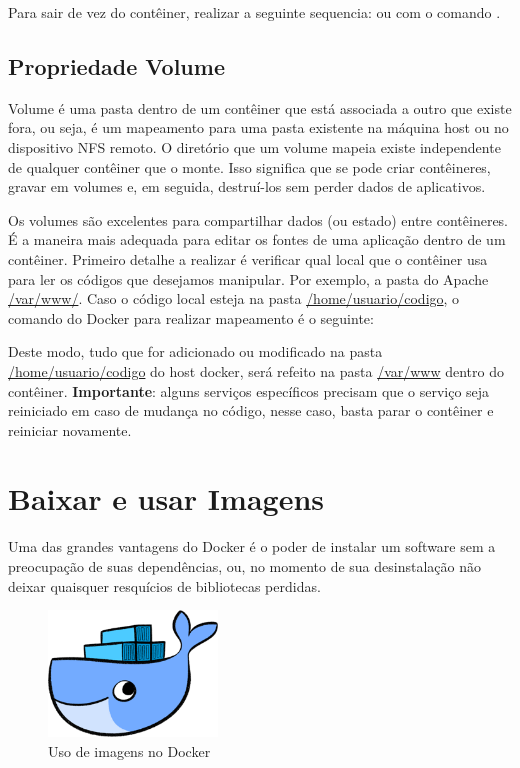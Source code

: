 \documentclass[a4paper,11pt]{article}
\begin{document}
Para sair de vez do contêiner, realizar a seguinte sequencia: 
 ou com o comando .

\subsection{Propriedade Volume}
Volume é uma pasta dentro de um contêiner que está associada a outro que existe fora, ou seja, é um mapeamento para uma pasta existente na máquina host ou no dispositivo NFS remoto. O diretório que um volume mapeia existe independente de qualquer contêiner que o monte. Isso significa que se pode criar contêineres, gravar em volumes e, em seguida, destruí-los sem perder dados de aplicativos.

Os volumes são excelentes para compartilhar dados (ou estado) entre contêineres. É a maneira mais adequada para editar os fontes de uma aplicação dentro de um contêiner. Primeiro detalhe a realizar é verificar qual local que o contêiner usa para ler os códigos que desejamos manipular. Por exemplo, a pasta do Apache \url{/var/www/}. Caso o código local esteja na pasta \url{/home/usuario/codigo}, o comando do Docker para realizar mapeamento é o seguinte: \\

Deste modo, tudo que for adicionado ou modificado na pasta \url{/home/usuario/codigo} do host docker, será refeito na pasta \url{/var/www} dentro do contêiner. \textbf{Importante}: alguns serviços específicos precisam que o serviço seja reiniciado em caso de mudança no código, nesse caso, basta parar o contêiner e reiniciar novamente.

\section{Baixar e usar Imagens}
Uma das grandes vantagens do Docker é o poder de instalar um software sem a preocupação de suas dependências, ou, no momento de sua desinstalação não deixar quaisquer resquícios de bibliotecas perdidas.
\begin{figure}[H]
	\centering
	\includegraphics[width=0.4\textwidth]{imagem/whale-docker-logo.png}
	\caption{Uso de imagens no Docker}
\end{figure}
\end{document}
